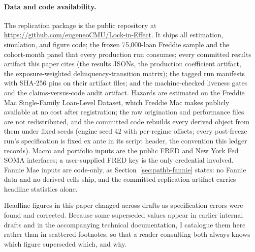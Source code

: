 \documentclass[12pt]{article}
\begin{document}
\paragraph{Data and code availability.} The replication package is the public repository at \url{https://github.com/eugeneoCMU/Lock-in-Effect}. It ships all estimation, simulation, and figure code; the frozen 75{,}000-loan Freddie sample and the cohort-month panel that every production run consumes; every committed results artifact this paper cites (the results JSONs, the production coefficient artifact, the exposure-weighted delinquency-transition matrix); the tagged run manifests with SHA-256 pins on their artifact files; and the machine-checked liveness gates and the claims-versus-code audit artifact. Hazards are estimated on the Freddie Mac Single-Family Loan-Level Dataset, which Freddie Mac makes publicly available at no cost after registration; the raw origination and performance files are not redistributed, and the committed code rebuilds every derived object from them under fixed seeds (engine seed 42 with per-regime offsets; every post-freeze run's specification is fixed ex ante in its script header, the convention this ledger records). Macro and portfolio inputs are the public FRED and New York Fed SOMA interfaces; a user-supplied FRED key is the only credential involved. Fannie Mae inputs are code-only, as Section~\ref{sec:pathb-fannie} states: no Fannie data and no derived cells ship, and the committed replication artifact carries headline statistics alone.

Headline figures in this paper changed across drafts as specification errors were found and corrected. Because some superseded values appear in earlier internal drafts and in the accompanying technical documentation, I catalogue them here rather than in scattered footnotes, so that a reader consulting both always knows which figure superseded which, and why.
\end{document}
